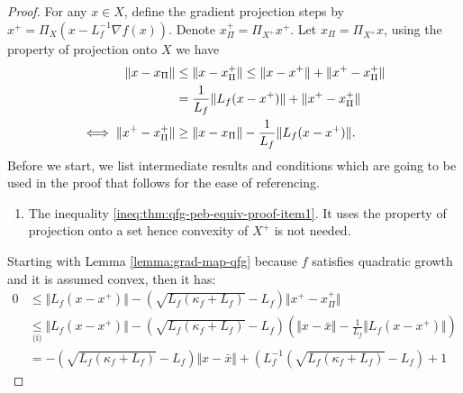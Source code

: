\documentclass[12pt]{report}
\begin{document}
            \begin{proof}
                For any $x \in X$, define the gradient projection steps by $x^+ = \Pi_{X}(x - L^{-1}_f\nabla f(x))$. 
                Denote $x^+_\Pi = \Pi_{X^+}x^+$. 
                Let $x_\Pi = \Pi_{X^+}x$, using the property of projection onto $X$ we have 
                \begin{align}\label{ineq:thm:qfg-peb-equiv-proof-item1}
                    \Vert x - x_\Pi\Vert &\le \Vert x - x_\Pi^+\Vert
                    \le \Vert x - x^+\Vert + \Vert x^+ - x^+_\Pi\Vert
                    \notag\\
                    &= \frac{1}{L_f}\Vert L_f(x - x^+)\Vert + \Vert x^+ - x^+_\Pi\Vert
                    \notag\\
                    \iff 
                    \Vert x^+ - x^+_\Pi\Vert &\ge
                    \Vert x - x_\Pi\Vert - \frac{1}{L_f}\Vert L_f(x - x^+)\Vert. 
                \end{align}
                Before we start, we list intermediate results and conditions which are going to be used in the proof that follows for the ease of referencing. 
                \begin{enumerate}
                    \item The inequality \eqref{ineq:thm:qfg-peb-equiv-proof-item1}. It uses the property of projection onto a set hence convexity of $X^+$ is not needed. 
                \end{enumerate}
                Starting with Lemma \ref{lemma:grad-map-qfg} because $f$ satisfies quadratic growth and it is assumed convex, then it has: 
                {\small
                \begin{align*}
                    0 &\le 
                    \Vert L_f(x - x^+)\Vert
                    - \left(\sqrt{L_f(\kappa_f + L_f)} - L_f\right)\Vert x^+ - x^+_\Pi\Vert
                    \\
                    &\underset{\text{(i)}}{\le}
                    \Vert L_f(x - x^+)\Vert
                    -
                    \left(\sqrt{L_f(\kappa_f + L_f)} - L_f\right)\left(
                        \Vert x - \bar x\Vert - \frac{1}{L_f}\Vert L_f(x - x^+)\Vert
                    \right)
                    \\
                    &=
                    - \left(
                        \sqrt{L_f(\kappa_f + L_f)} - L_f
                    \right)\Vert x - \bar x\Vert
                    +
                    \left(
                        L^{-1}_f\left(\sqrt{L_f(\kappa_f + L_f)} - L_f\right) + 1

\end{align*}}
\end{proof}
\end{document}

